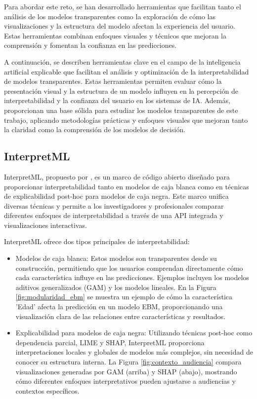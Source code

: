 Para abordar este reto, se han desarrollado herramientas que facilitan tanto el análisis de los modelos transparentes como la exploración de cómo las visualizaciones y la estructura del modelo afectan la experiencia del usuario. Estas herramientas combinan enfoques visuales y técnicos que mejoran la comprensión y fomentan la confianza en las predicciones.

A continuación, se describen herramientas clave en el campo de la inteligencia artificial explicable que facilitan el análisis y optimización de la interpretabilidad de modelos transparentes. Estas herramientas permiten evaluar cómo la presentación visual y la estructura de un modelo influyen en la percepción de interpretabilidad y la confianza del usuario en los sistemas de IA. Además, proporcionan una base sólida para estudiar los modelos transparentes de este trabajo, aplicando metodologías prácticas y enfoques visuales que mejoran tanto la claridad como la comprensión de los modelos de decisión.

\subsection{InterpretML}

InterpretML, propuesto por \textcite{nori2019interpretml}, es un marco de código abierto diseñado para proporcionar interpretabilidad tanto en modelos de caja blanca como en técnicas de explicabilidad post-hoc para modelos de caja negra. Este marco unifica diversas técnicas y permite a los investigadores y profesionales comparar diferentes enfoques de interpretabilidad a través de una API integrada y visualizaciones interactivas.

InterpretML ofrece dos tipos principales de interpretabilidad:
\begin{itemize}
    \item Modelos de caja blanca: Estos modelos son transparentes desde su construcción, permitiendo que los usuarios comprendan directamente cómo cada característica influye en las predicciones. Ejemplos incluyen los modelos aditivos generalizados (GAM) y los modelos lineales. En la Figura \ref{fig:modularidad_ebm} se muestra un ejemplo de cómo la característica 'Edad' afecta la predicción en un modelo EBM, proporcionando una visualización clara de las relaciones entre características y resultados.
    \item Explicabilidad para modelos de caja negra: Utilizando técnicas post-hoc como dependencia parcial, LIME y SHAP, InterpretML proporciona interpretaciones locales y globales de modelos más complejos, sin necesidad de conocer su estructura interna. La Figura \ref{fig:contexto_audiencia} compara visualizaciones generadas por GAM (arriba) y SHAP (abajo), mostrando cómo diferentes enfoques interpretativos pueden ajustarse a audiencias y contextos específicos.
\end{itemize}

